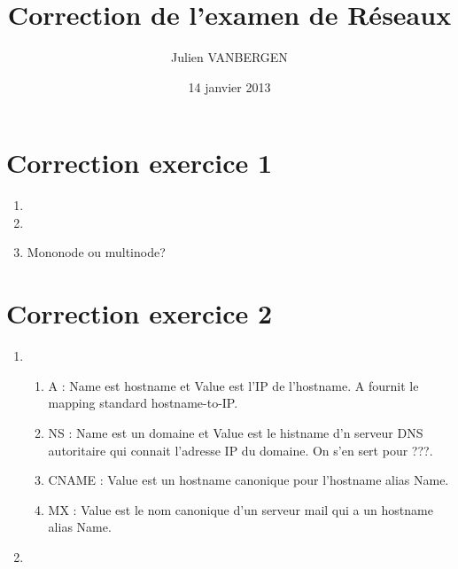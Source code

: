 \documentclass[a4paper, 11pt, titlepage]{article}
\title{Correction de l'examen de Réseaux}
\date{14 janvier 2013}
\author{Julien VANBERGEN}
\begin{document}
\maketitle

\section{Correction exercice 1}
\begin{enumerate}[label=(\alph*)]
\item

\item 

\item 
Mononode ou multinode?

\end{enumerate}

\section{Correction exercice 2}
\begin{enumerate}[label=(\alph*)]
\item
\begin{enumerate}[label=(\roman*)]
\item A : Name est hostname et Value est l'IP de l'hostname. A fournit le mapping standard hostname-to-IP.
\item NS : Name est un domaine et Value est le histname d'n serveur DNS autoritaire qui connait l'adresse IP du domaine. On s'en sert pour ???.
\item CNAME : Value est un hostname canonique pour l'hostname alias Name.
\item MX : Value est le nom canonique d'un serveur mail qui a un hostname alias Name.
\end{enumerate}

\item


\end{enumerate}
\end{document}
